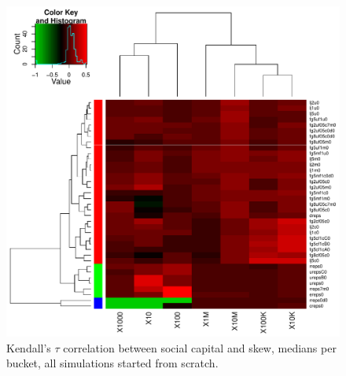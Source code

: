\documentclass[10pt,oneside]{memoir}
\begin{document}
\begin{Spacing}{2}
\begin{figure}
\begin{center}
    \includegraphics{figures/crop/heatmap-cstaubs-medians-0wk}
    \caption{Kendall’s $\tau$ correlation between social capital and skew, medians per bucket, all simulations started from scratch.}
    \label{figure:heatmap-cstaubs-0wk}
\end{center}
\end{figure}


\end{Spacing}
\end{document}
